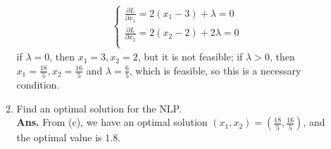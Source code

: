 \documentclass[12pt]{article}
\begin{document}
\begin{enumerate}
\begin{enumerate}
\begin{align*}
\begin{cases}
                                    \frac{\partial L}{\partial x_1} = 2(x_1 - 3) + \lambda = 0  \\
                                    \frac{\partial L}{\partial x_2} = 2(x_2 - 2) + 2\lambda = 0 \\
                              \end{cases}
                        \end{align*}
                        if $\lambda = 0$, then $x_1 = 3, x_2 = 2$, but it is not feasible; if $\lambda > 0$, then $x_1 = \frac{18}{5}, x_2 = \frac{16}{5}$ and $\lambda = \frac{6}{5}$, which is feasible, so this is a necessary condition.
                  \item Find an optimal solution for the NLP.\\
                        \textbf{Ans.}
                        From (c), we have an optimal solution $(x_1,x_2) = (\frac{18}{5},\frac{16}{5})$, and the optimal value is $1.8$.
            \end{enumerate}
\end{enumerate}
\end{document}
